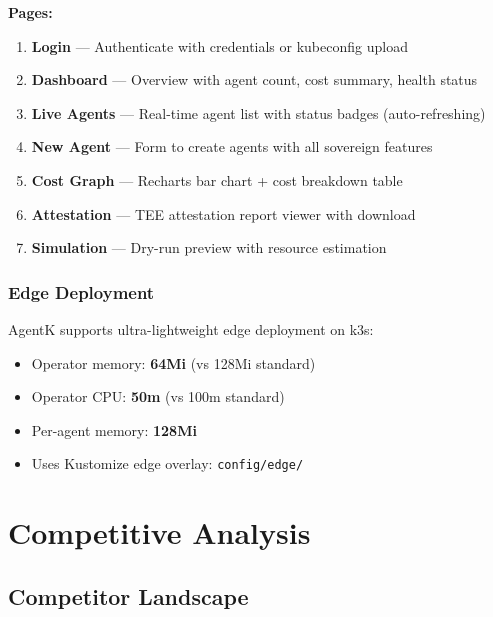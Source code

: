 \documentclass[12pt,a4paper,openany]{report}
\begin{document}
\textbf{Pages:}
\begin{enumerate}
    \item \textbf{Login} — Authenticate with credentials or kubeconfig upload
    \item \textbf{Dashboard} — Overview with agent count, cost summary, health status
    \item \textbf{Live Agents} — Real-time agent list with status badges (auto-refreshing)
    \item \textbf{New Agent} — Form to create agents with all sovereign features
    \item \textbf{Cost Graph} — Recharts bar chart + cost breakdown table
    \item \textbf{Attestation} — TEE attestation report viewer with download
    \item \textbf{Simulation} — Dry-run preview with resource estimation
\end{enumerate}

\section{Edge Deployment}

AgentK supports ultra-lightweight edge deployment on k3s:
\begin{itemize}
    \item Operator memory: \textbf{64Mi} (vs 128Mi standard)
    \item Operator CPU: \textbf{50m} (vs 100m standard)
    \item Per-agent memory: \textbf{128Mi}
    \item Uses Kustomize edge overlay: \texttt{config/edge/}
\end{itemize}


\part{Competitive Analysis}

\chapter{Competitor Landscape}
\end{document}
